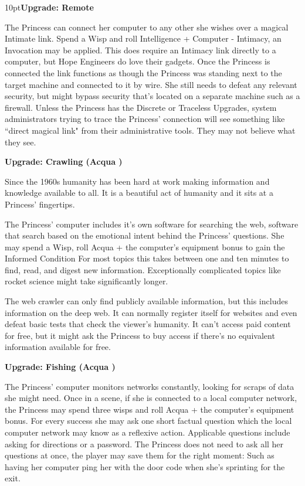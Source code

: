 \begin{myindentpar}{10pt}\textbf{Upgrade: Remote}

The Princess can connect her computer to any other she wishes over a magical Intimate link. Spend a Wisp and roll Intelligence + Computer - Intimacy, an Invocation may be applied. This does require an Intimacy link directly to a computer, but Hope Engineers do love their gadgets. Once the Princess is connected the link functions as though the Princess was standing next to the target machine and connected to it by wire. She still needs to defeat any relevant security, but might bypass security that's located on a separate machine such as a firewall. Unless the Princess has the Discrete or Traceless Upgrades, system administrators trying to trace the Princess' connection will see something like \textquotedblleft direct magical link" from their administrative tools. They may not believe what they see. 

\textbf{Upgrade: Crawling (Acqua \textbullet\textbullet)}

Since the 1960s humanity has been hard at work making information and knowledge available to all. It is a beautiful act of humanity and it sits at a Princess' fingertips. 

The Princess' computer includes it's own software for searching the web, software that search based on the emotional intent behind the Princess' questions. She may spend a Wisp, roll Acqua + the computer's equipment bonus to gain the Informed Condition For most topics this takes between one and ten minutes to find, read, and digest new information. Exceptionally complicated topics like rocket science might take significantly longer.

The web crawler can only find publicly available information, but this includes information on the deep web. It can normally register itself for websites and even defeat basic tests that check the viewer's humanity. It can't access paid content for free, but it might ask the Princess to buy access if there's no equivalent information available for free. 

\textbf{Upgrade: Fishing (Acqua \textbullet\textbullet)}

The Princess' computer monitors networks constantly, looking for scraps of data she might need. Once in a scene, if she is connected to a local computer network, the Princess may spend three wisps and roll Acqua + the computer's equipment bonus. For every success she may ask one short factual question which the local computer network may know as a reflexive action. Applicable questions include asking for directions or a password. The Princess does not need to ask all her questions at once, the player may save them for the right moment: Such as having her computer ping her with the door code when she's sprinting for the exit.


\end{myindentpar}

